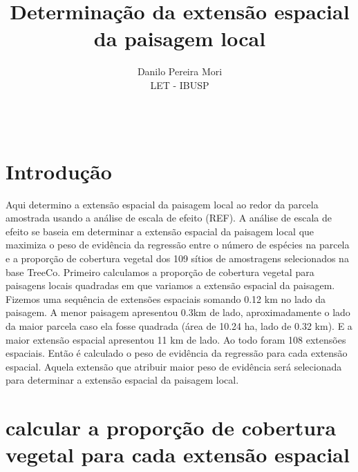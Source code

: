 \documentclass{article}
\title{Determinação da extensão espacial da paisagem local}
\author{
    Danilo Pereira Mori
   \\
    LET - IBUSP \\
   \\
  \texttt{} \\
  }
\begin{document}
\maketitle


\begin{abstract}

\end{abstract}


\hypertarget{introduuxe7uxe3o}{%
\section{Introdução}\label{introduuxe7uxe3o}}

Aqui determino a extensão espacial da paisagem local ao redor da parcela
amostrada usando a análise de escala de efeito (REF). A análise de
escala de efeito se baseia em determinar a extensão espacial da paisagem
local que maximiza o peso de evidência da regressão entre o número de
espécies na parcela e a proporção de cobertura vegetal dos 109 sítios de
amostragens selecionados na base TreeCo. Primeiro calculamos a proporção
de cobertura vegetal para paisagens locais quadradas em que variamos a
extensão espacial da paisagem. Fizemos uma sequência de extensões
espaciais somando 0.12 km no lado da paisagem. A menor paisagem
apresentou 0.3km de lado, aproximadamente o lado da maior parcela caso
ela fosse quadrada (área de 10.24 ha, lado de 0.32 km). E a maior
extensão espacial apresentou 11 km de lado. Ao todo foram 108 extensões
espaciais. Então é calculado o peso de evidência da regressão para cada
extensão espacial. Aquela extensão que atribuir maior peso de evidência
será selecionada para determinar a extensão espacial da paisagem local.

\hypertarget{calcular-a-proporuxe7uxe3o-de-cobertura-vegetal-para-cada-extensuxe3o-espacial}{%
\section{calcular a proporção de cobertura vegetal para cada extensão
espacial}\label{calcular-a-proporuxe7uxe3o-de-cobertura-vegetal-para-cada-extensuxe3o-espacial}}
\end{document}
